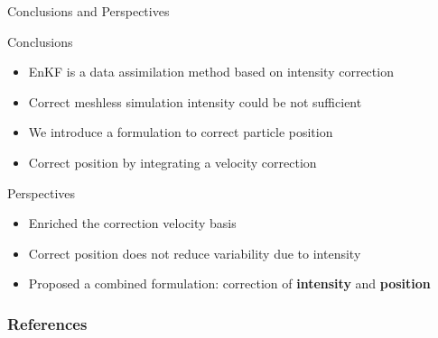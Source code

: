 \documentclass[aspectratio=169]{beamer} %
\begin{document}
\begin{frame}{Conclusions and Perspectives}

    \begin{block}{Conclusions}
        \begin{itemize}
            \item EnKF is a data assimilation method based on intensity correction
            \item Correct meshless simulation intensity could be not sufficient
            \item We introduce a formulation to correct particle position
            \item Correct position by integrating a velocity correction
        \end{itemize}
    \end{block}

    \begin{block}{Perspectives}
        \begin{itemize}
            \item Enriched the correction velocity basis
            \item Correct position does not reduce variability due to intensity
            \item Proposed a combined formulation: correction of \textbf{intensity} and \textbf{position}
        \end{itemize}
    \end{block}
\end{frame}

\closingframe

\begin{frame}
    \frametitle{References}
    \printbibliography %
\end{frame}

\end{document}
